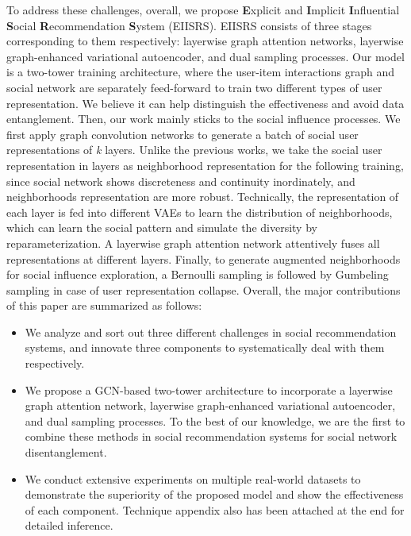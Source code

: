 \documentclass[letterpaper]{article} %
\begin{document}
To address these challenges, overall, we propose \textbf{E}xplicit and \textbf{I}mplicit \textbf{I}nfluential \textbf{S}ocial \textbf{R}ecommendation \textbf{S}ystem (EIISRS). EIISRS consists of three stages corresponding to them respectively: layerwise graph attention networks, layerwise graph-enhanced variational autoencoder, and dual sampling processes. Our model is a two-tower training architecture, where the user-item interactions graph and social network are separately feed-forward to train two different types of user representation. We believe it can help distinguish the effectiveness and avoid data entanglement. Then, our work mainly sticks to the social influence processes. We first apply graph convolution networks to generate a batch of social user representations of \textit{k} layers. Unlike the previous works, we take the social user representation in layers as neighborhood representation for the following training, since social network shows discreteness and continuity inordinately, and neighborhoods representation are more robust. Technically, the representation of each layer is fed into different VAEs to learn the distribution of neighborhoods, which can learn the social pattern and simulate the diversity by reparameterization. A layerwise graph attention network attentively fuses all representations at different layers. Finally, to generate augmented neighborhoods for social influence exploration, a Bernoulli sampling is followed by Gumbeling sampling in case of user representation collapse. Overall, the major contributions of this paper are summarized as follows:
\begin{itemize}
    \item We analyze and sort out three different challenges in social recommendation systems, and innovate three components to systematically deal with them respectively.
    \item We propose a GCN-based two-tower architecture to incorporate a layerwise graph attention network, layerwise graph-enhanced variational autoencoder, and dual sampling processes. To the best of our knowledge, we are the first to combine these methods in social recommendation systems for social network disentanglement. 
    \item We conduct extensive experiments on multiple real-world datasets to demonstrate the superiority of the proposed model and show the effectiveness of each component. Technique appendix also has been attached at the end for detailed inference. 
\end{itemize}
\end{document}
